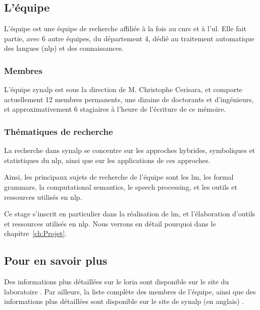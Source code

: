 \subsection{L'équipe }
L'équipe  est une équipe de recherche affiliée à la fois au \gls{cnrs} et à l'\gls{ul}.
Elle fait partie, avec 6 autre équipes, du département 4, dédié au traitement automatique des langues (\gls{nlp}) et des connaissances.

\subsubsection*{Membres}
L'équipe \gls{synalp} est sous la direction de M. Christophe Cerisara, et comporte actuellement 12 membres permanents, une dizaine de doctorants et d'ingénieurs, et approximativement 6 stagiaires à l'heure de l'écriture de ce mémoire.

\subsubsection*{Thématiques de recherche}
La recherche dans \gls{synalp} se concentre sur les approches hybrides, symboliques et statistiques du \gls{nlp}, ainsi que sur les applications de ces approches.

Ainsi, les principaux sujets de recherche de l'équipe sont les \gls{lm}, les \gls{formal grammars}, la \gls{computational semantics}, le \gls{speech processing}, et les outils et ressources utilisés en \gls{nlp}.

Ce stage s'inscrit en particulier dans la réalisation de \gls{lm}, et l'élaboration d'outils et ressources utilisés en \gls{nlp}. Nous verrons en détail pourquoi dans le chapitre~\ref{ch:Projet}.

\subsection*{Pour en savoir plus}
Des informations plus détaillées sur le \gls{loria} sont disponible sur {le site du laboratoire \autocite{about_loria}}.
Par ailleurs, la liste complète des membres de l'équipe, ainsi que des informations plus détaillées sont disponible sur {le site de \gls{synalp} (en anglais) \autocite{about_synalp}}.


